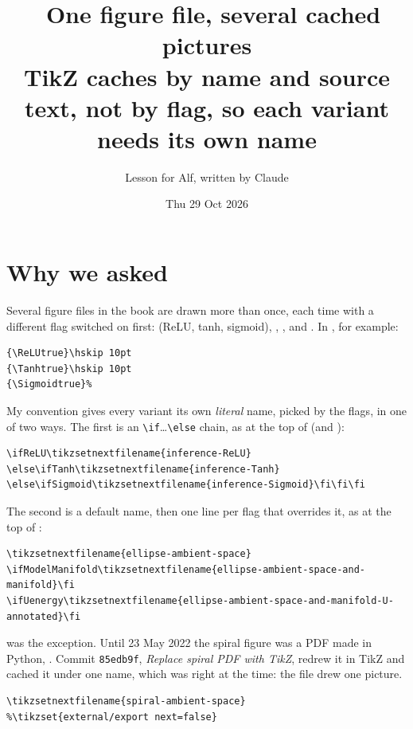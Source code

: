 \documentclass[11pt,a4paper]{article}
\title{\emo{framed picture}\ One figure file, several cached pictures\\[0.3em]
  \large TikZ caches by name and source text, not by flag, so each variant needs its own name}
\author{Lesson for Alf, written by Claude}
\date{Thu 29 Oct 2026}
\let\sectionalone\section
\renewcommand{\section}{\needspace{8\baselineskip}\sectionalone}
\newcommand{\cs}[1]{\texttt{\textbackslash #1}}
\begin{document}
\maketitle

\section*{Why we asked}

Several figure files in the book are drawn more than once, each time with a different flag switched on first:  (ReLU, tanh, sigmoid), , , and . In , for example:

\begin{lstlisting}[style=latex]
{\ReLUtrue}\hskip 10pt
{\Tanhtrue}\hskip 10pt
{\Sigmoidtrue}%
\end{lstlisting}

My convention gives every variant its own \emph{literal} name, picked by the flags, in one of two ways. The first is an \cs{if}…\cs{else} chain, as at the top of  (and ):

\begin{lstlisting}[style=latex]
\ifReLU\tikzsetnextfilename{inference-ReLU}
\else\ifTanh\tikzsetnextfilename{inference-Tanh}
\else\ifSigmoid\tikzsetnextfilename{inference-Sigmoid}\fi\fi\fi
\end{lstlisting}

The second is a default name, then one line per flag that overrides it, as at the top of :

\begin{lstlisting}[style=latex]
\tikzsetnextfilename{ellipse-ambient-space}
\ifModelManifold\tikzsetnextfilename{ellipse-ambient-space-and-manifold}\fi
\ifUenergy\tikzsetnextfilename{ellipse-ambient-space-and-manifold-U-annotated}\fi
\end{lstlisting}

 was the exception. Until 23 May 2022 the spiral figure was a PDF made in Python, . Commit \texttt{85edb9f}, \textit{Replace spiral PDF with TikZ}, redrew it in TikZ and cached it under one name, which was right at the time: the file drew one picture.

\begin{lstlisting}[style=latex]
\tikzsetnextfilename{spiral-ambient-space}
%\tikzset{external/export next=false}
\end{lstlisting}
\end{document}
